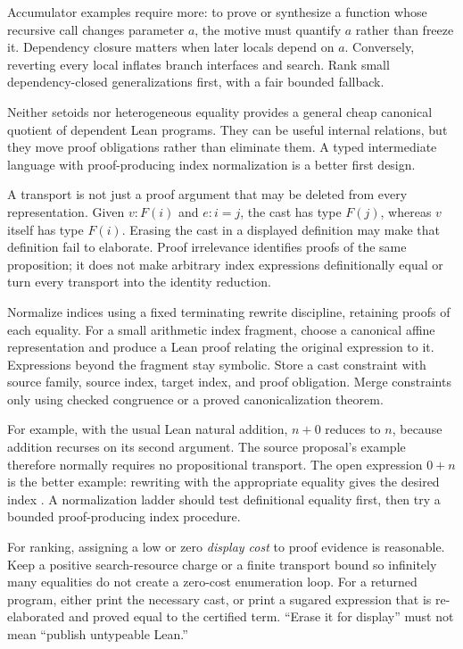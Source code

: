 Accumulator examples require more: to prove or synthesize a function whose recursive call changes parameter $a$, the motive must quantify $a$ rather than freeze it. Dependency closure matters when later locals depend on $a$. Conversely, reverting every local inflates branch interfaces and search. Rank small dependency-closed generalizations first, with a fair bounded fallback.

\ans Neither setoids nor heterogeneous equality provides a general cheap canonical quotient of dependent Lean programs. They can be useful internal relations, but they move proof obligations rather than eliminate them. A typed intermediate language with proof-producing index normalization is a better first design.

A transport is not just a proof argument that may be deleted from every representation. Given $v:F(i)$ and $e:i=j$, the cast has type $F(j)$, whereas $v$ itself has type $F(i)$. Erasing the cast in a displayed definition may make that definition fail to elaborate. Proof irrelevance identifies proofs of the same proposition; it does not make arbitrary index expressions definitionally equal or turn every transport into the identity reduction.

Normalize indices using a fixed terminating rewrite discipline, retaining proofs of each equality. For a small arithmetic index fragment, choose a canonical affine representation and produce a Lean proof relating the original expression to it. Expressions beyond the fragment stay symbolic. Store a cast constraint with source family, source index, target index, and proof obligation. Merge constraints only using checked congruence or a proved canonicalization theorem.

For example, with the usual Lean natural addition, $n+0$ reduces to $n$, because addition recurses on its second argument. The source proposal's  example therefore normally requires no propositional transport. The open expression $0+n$ is the better example: rewriting with the appropriate equality gives the desired index \cite{leanprelude}. A normalization ladder should test definitional equality first, then try a bounded proof-producing index procedure.

For ranking, assigning a low or zero \emph{display cost} to proof evidence is reasonable. Keep a positive search-resource charge or a finite transport bound so infinitely many equalities do not create a zero-cost enumeration loop. For a returned program, either print the necessary cast, or print a sugared expression that is re-elaborated and proved equal to the certified term. ``Erase it for display'' must not mean ``publish untypeable Lean.''

